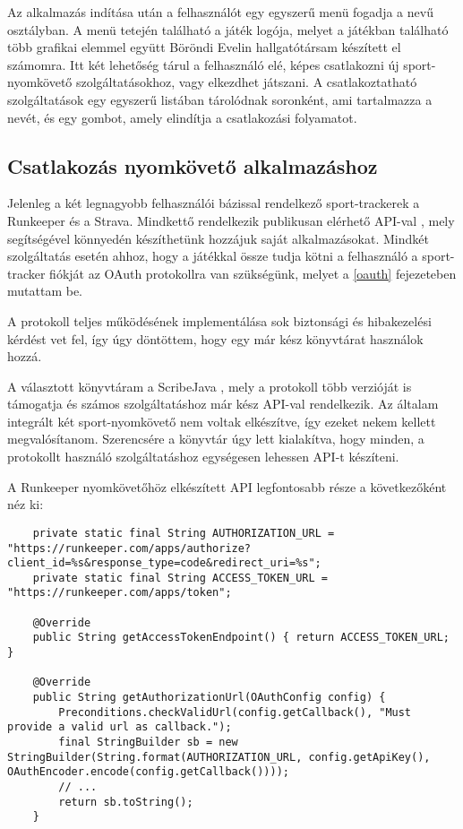 Az alkalmazás indítása után a felhasználót egy egyszerű menü fogadja a  nevű osztályban. 
A menü tetején található a játék logója, melyet a játékban található több grafikai elemmel együtt Böröndi Evelin hallgatótársam készített el számomra. 
Itt két lehetőség tárul a felhasználó elé, képes csatlakozni új sport-nyomkövető szolgáltatásokhoz, vagy elkezdhet játszani. 
A csatlakoztatható szolgáltatások egy egyszerű listában tárolódnak soronként, ami tartalmazza a nevét, és egy gombot, amely elindítja a csatlakozási folyamatot. 

\subsection*{Csatlakozás nyomkövető alkalmazáshoz}
\label{trackerconnect}
Jelenleg a két legnagyobb felhasználói bázissal rendelkező sport-trackerek a Runkeeper és a Strava. 
Mindkettő rendelkezik publikusan elérhető API-val \cite{runkeeperapi} \cite{stravaapi}, mely segítségével könnyedén készíthetünk hozzájuk saját alkalmazásokat. 
Mindkét szolgáltatás esetén ahhoz, hogy a játékkal össze tudja kötni a felhasználó a sport-tracker fiókját az OAuth protokollra van szükségünk, melyet a \ref{oauth} fejezeteben mutattam be. 

A protokoll teljes működésének implementálása sok biztonsági és hibakezelési kérdést vet fel, így úgy döntöttem, hogy egy már kész könyvtárat használok hozzá. 

A választott könyvtáram a ScribeJava \cite{scribejava}, mely a protokoll több verzióját is támogatja és számos szolgáltatáshoz már kész API-val rendelkezik. 
Az általam integrált két sport-nyomkövető nem voltak elkészítve, így ezeket nekem kellett megvalósítanom. 
Szerencsére a könyvtár úgy lett kialakítva, hogy minden, a protokollt használó szolgáltatáshoz egységesen lehessen API-t készíteni. 

A Runkeeper nyomkövetőhöz elkészített API legfontosabb része a következőként néz ki:

\begin{lstlisting}
    private static final String AUTHORIZATION_URL = "https://runkeeper.com/apps/authorize?client_id=%s&response_type=code&redirect_uri=%s";
    private static final String ACCESS_TOKEN_URL = "https://runkeeper.com/apps/token";

    @Override
    public String getAccessTokenEndpoint() { return ACCESS_TOKEN_URL; }

    @Override
    public String getAuthorizationUrl(OAuthConfig config) {
        Preconditions.checkValidUrl(config.getCallback(), "Must provide a valid url as callback.");
        final StringBuilder sb = new StringBuilder(String.format(AUTHORIZATION_URL, config.getApiKey(), OAuthEncoder.encode(config.getCallback())));
        // ...
        return sb.toString();
    }
\end{lstlisting}

